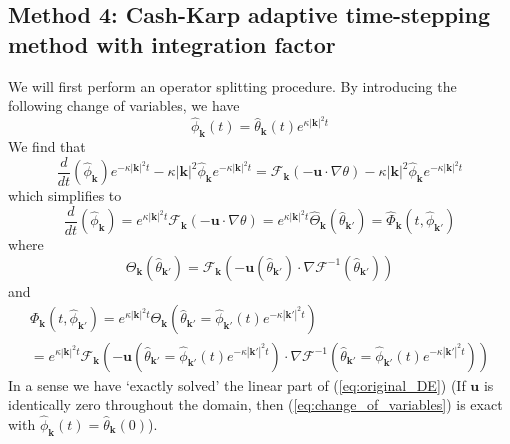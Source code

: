 \documentclass[12pt]{article}
\begin{document}
\subsection{Method 4: Cash-Karp adaptive time-stepping method with integration factor }

We will first perform an operator splitting procedure. By introducing the following change of variables, we have 
\begin{equation}
\label{eq:change_of_variables}
\hat{\phi}_{\mathbf{k}}(t)= \hat{\theta}_{\mathbf{k}}(t)e^{\kappa |\mathbf{k}|^{2}t}
\end{equation}
We find that 
\begin{equation}
\frac{d}{dt}(\hat{\phi}_{\mathbf{k}})e^{-\kappa |\mathbf{k}|^{2}t} -\kappa |\mathbf{k}|^{2} \hat{\phi}_{\mathbf{k}}e^{-\kappa |\mathbf{k}|^{2}t} = \mathcal{F}_{\mathbf{k}}(- \mathbf{u}\cdot\nabla \theta) - \kappa |\mathbf{k}|^{2}\hat{\phi}_{\mathbf{k}}e^{-\kappa |\mathbf{k}|^{2}t}
\end{equation} 
which simplifies to 
\begin{equation}
\frac{d}{dt}(\hat{\phi}_{\mathbf{k}})= e^{\kappa |\mathbf{k}|^{2}t}\mathcal{F}_{\mathbf{k}}(- \mathbf{u}\cdot\nabla \theta)  = e^{\kappa |\mathbf{k}|^{2}t}\hat{\Theta}_{\mathbf{k}}(\hat{\theta}_{\mathbf{k}'}) =\hat{\Phi}_{\mathbf{k}}(t,\hat{\phi}_{\mathbf{k}'}) 
\end{equation} 
where 
\begin{equation}
\Theta_{\mathbf{k}}(\hat{\theta}_{\mathbf{k}'})=\mathcal{F}_{\mathbf{k}}(- \mathbf{u}(\hat{\theta}_{\mathbf{k}'})\cdot\nabla \mathcal{F}^{-1}(\hat{\theta}_{\mathbf{k}'}))
\end{equation}
and
\begin{multline}
\Phi_{\mathbf{k}}(t,\hat{\phi}_{\mathbf{k}'})=e^{\kappa |\mathbf{k}|^{2}t}\Theta_{\mathbf{k}}(\hat{\theta}_{\mathbf{k}'}=\hat{\phi}_{\mathbf{k}'}(t)e^{-\kappa |\mathbf{k}'|^{2}t})\\
=e^{\kappa |\mathbf{k}|^{2}t}\mathcal{F}_{\mathbf{k}}(- \mathbf{u}(\hat{\theta}_{\mathbf{k}'}=\hat{\phi}_{\mathbf{k}'}(t)e^{-\kappa |\mathbf{k}'|^{2}t})\cdot\nabla \mathcal{F}^{-1}(\hat{\theta}_{\mathbf{k}'}=\hat{\phi}_{\mathbf{k}'}(t)e^{-\kappa |\mathbf{k}'|^{2}t}))
\end{multline}
In a sense we have `exactly solved' the linear part of (\ref{eq:original_DE}) (If $\mathbf{u}$ is identically zero throughout the domain, then (\ref{eq:change_of_variables}) is exact with $\hat{\phi}_{\mathbf{k}}(t)=\hat{\theta}_{\mathbf{k}}(0)$).    
\end{document}
